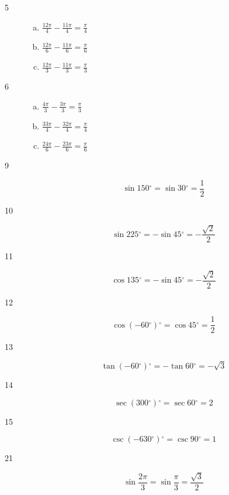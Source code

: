 \documentclass{exam}
\newcommand{\dg}{\ensuremath{^\circ}}
\begin{document}
\begin{description}
      \item[5] 
        \begin{enumerate}[(a)]
          \item $\frac{12 \pi}{4} - \frac{11 \pi}{4} = \boxed{ \frac{\pi}{4} }$
          \item $\frac{12 \pi}{6} - \frac{11 \pi}{6} = \boxed{ \frac{\pi}{6} }$
          \item $\frac{12 \pi}{3} - \frac{11 \pi}{3} = \boxed{ \frac{\pi}{3} }$
        \end{enumerate}

      \item[6] 
        \begin{enumerate}[(a)]
          \item $\frac{4 \pi}{3} - \frac{3 \pi}{3} = \boxed{ \frac{\pi}{3} }$
          \item $\frac{33 \pi}{4} - \frac{32 \pi}{4} = \boxed{ \frac{\pi}{4} }$
          \item $\frac{24 \pi}{6} - \frac{23 \pi}{6} = \boxed{ \frac{\pi}{6} }$
        \end{enumerate}

      \item[9]
        \[
          \sin 150 \dg = \sin 30 \dg = \boxed{ \frac{1}{2} }
        \]

      \item[10]
        \[
          \sin 225 \dg = - \sin 45 \dg = \boxed{ - \frac{\sqrt{2}}{2} }
        \]

      \item[11]
        \[
          \cos 135 \dg = - \sin 45 \dg = \boxed{ - \frac{\sqrt{2}}{2} }
        \]

      \item[12]
        \[
          \cos (-60 \dg) \dg = \cos 45 \dg = \boxed{ \frac{1}{2} }
        \]

      \item[13]
        \[
          \tan (-60 \dg) \dg = - \tan 60 \dg = \boxed{ - \sqrt{3} }
        \]

      \item[14]
        \[
          \sec (300 \dg) \dg = \sec 60 \dg = \boxed{ 2 }
        \]

      \item[15]
        \[
          \csc (-630 \dg) \dg = \csc 90 \dg = \boxed{ 1 }
        \]

      \item[21]
        \[
          \sin \frac{2 \pi}{3} = \sin \frac{\pi}{3} = \boxed{ \frac{\sqrt{3}}{2} }
        \]


\end{description}
\end{document}
